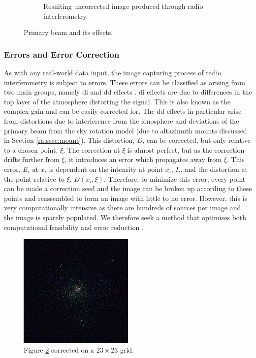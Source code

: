 \begin{figure}[H]
\begin{subfigure}{0.45\textwidth}
	\caption{Resulting uncorrected image produced through radio interferometry.}
	\label{ra:fig:uncorr}
  \end{subfigure}
  \caption{Primary beam and its effects.}
\end{figure}
%
\subsubsection{Errors and Error Correction}\label{ra:ssec:eec}
As with any real-world data input, the image capturing process of radio interferometry is subject to errors. These errors can be classified as arising from two main groups, namely \gls{di} and \gls{dd} effects \citep{smirnov2011revisiting}. \gls{di} effects are due to differences in the top layer of the atmosphere distorting the signal. This is also known as the complex gain and can be easily corrected for. The \gls{dd} effects in particular arise from distortions due to interference from the ionosphere and deviations of the primary beam from the sky rotation model (due to altazimuth mounts discussed in Section \ref{ra:ssec:mount}). This distortion, $D$, can be corrected, but only relative to a chosen point, $\xi$. The correction at $\xi$ is almost perfect, but as the correction drifts further from $\xi$, it introduces an error which propagates away from $\xi$. This error, $E_i$ at $x_i$ is dependent on the intensity at point $x_i$, $I_i$, and the distortion at the point relative to $\xi$, $D(x_i,\xi)$. Therefore, to minimize this error, every point can be made a correction seed and the image can be broken up according to these points and reassembled to form an image with little to no error. However, this is very computationally intensive as there are hundreds of sources per image and the image is sparely populated. We therefore seek a method that optimises both computational feasibility and error reduction \citep{smirnov2015radio}.
\begin{figure}[H]
	\centering
	\includegraphics[width=0.5\textwidth]{Images/corrected-23x23.png}
	\caption{Figure \ref{ra:fig:uncorr} corrected on a $23\times23$ grid.}
	\label{ra:fig:cor23}
\end{figure}

